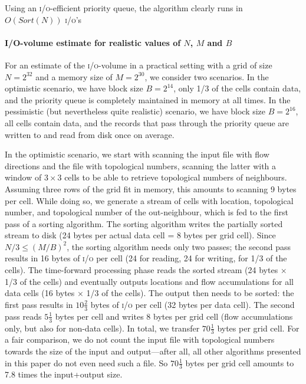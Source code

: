 \documentclass[10pt,a4paper]{article}
\def\io{\textsc{i/o}\xspace}
\def\ios{\textsc{i/o}'s\xspace}
\def\sort{\mathit{Sort}}
\begin{document}
Using an \io-efficient priority queue, the algorithm clearly runs in $O(\sort(N))$ \ios~\cite{terraflow,gridproblems}

\paragraph*{I/O-volume estimate for realistic values of $N$, $M$ and $B$}
For an estimate of the \io-volume in a practical setting with a grid of size $N = 2^{32}$ and a memory size of $M = 2^{30}$, we consider two scenarios. In the optimistic scenario, we have block size $B = 2^{14}$, only 1/3 of the cells contain data, and the priority queue is completely maintained in memory at all times. In the pessimistic (but nevertheless quite realistic) scenario, we have block size $B = 2^{16}$, all cells contain data, and the records that pass through the priority queue are written to and read from disk once on average.

In the optimistic scenario, we start with scanning the input file with flow directions and the file with topological numbers, scanning the latter with a window of $3 \times 3$ cells to be able to retrieve topological numbers of neighbours. Assuming three rows of the grid fit in memory, this amounts to scanning 9 bytes per cell. While doing so, we generate a stream of cells with location, topological number, and topological number of the out-neighbour, which is fed to the first pass of a sorting algorithm. The sorting algorithm writes the partially sorted stream to disk (24 bytes per actual data cell = 8 bytes per grid cell). Since $N/3 \leq (M/B)^2$, the sorting algorithm needs only two passes; the second pass results in 16 bytes of \io per cell (24 for reading, 24 for writing, for 1/3 of the cells). The time-forward processing phase reads the sorted stream (24 bytes $\times$ 1/3 of the cells) and eventually outputs locations and flow accumulations for all data cells (16 bytes $\times$ 1/3 of the cells). The output then needs to be sorted: the first pass results in $10\frac23$ bytes of \io per cell (32 bytes per data cell). The second pass reads $5\frac13$ bytes per cell and writes 8 bytes per grid cell (flow accumulations only, but also for non-data cells). In total, we transfer $70\frac13$ bytes per grid cell. For a fair comparison, we do not count the input file with topological numbers towards the size of the input and output---after all, all other algorithms presented in this paper do not even need such a file. So $70\frac13$ bytes per grid cell amounts to 7.8 times the input+output size.
\end{document}
